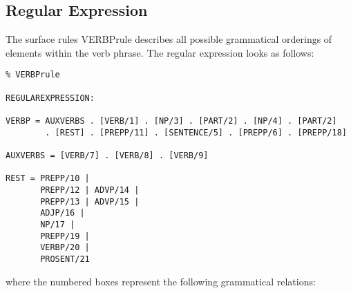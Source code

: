 \subsection{Regular Expression}
The surface rules VERBPrule describes all possible grammatical orderings of 
elements within the verb phrase. The regular expression looks as follows:
\begin{verbatim}
% VERBPrule

REGULAREXPRESSION:

VERBP = AUXVERBS . [VERB/1] . [NP/3] . [PART/2] . [NP/4] . [PART/2]
        . [REST] . [PREPP/11] . [SENTENCE/5] . [PREPP/6] . [PREPP/18]

AUXVERBS = [VERB/7] . [VERB/8] . [VERB/9]

REST = PREPP/10 | 
       PREPP/12 | ADVP/14 |
       PREPP/13 | ADVP/15 |
       ADJP/16 |
       NP/17 |
       PREPP/19 |
       VERBP/20 |
       PROSENT/21
\end{verbatim}
where the numbered boxes represent the following grammatical relations:\\
\newline
